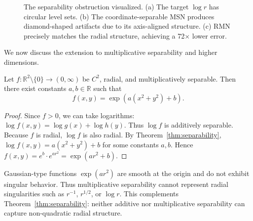 \documentclass[twoside,11pt]{article}
\newcommand{\R}{\mathbb{R}}
\begin{document}
\begin{figure}[!htbp]
	\caption{The separability obstruction visualized. (a) The target $\log r$ has circular level sets. (b) The coordinate-separable MSN produces diamond-shaped artifacts due to its axis-aligned structure. (c) RMN precisely matches the radial structure, achieving a 72$\times$ lower error.}
	\label{fig:obstruction_visual}
\end{figure}

We now discuss the extension to multiplicative separability and higher dimensions.

\begin{proposition}
	\label{prop:multiplicative}
	Let $f: \R^2 \setminus \{0\} \to (0, \infty)$ be $C^2$, radial, and multiplicatively separable. Then there exist constants $a, b \in \R$ such that
	\[
		f(x, y) = \exp(a(x^2 + y^2) + b).
	\]
\end{proposition}

\begin{proof}
	Since $f > 0$, we can take logarithms: $\log f(x, y) = \log g(x) + \log h(y)$. Thus $\log f$ is additively separable. Because $f$ is radial, $\log f$ is also radial. By Theorem~\ref{thm:separability}, $\log f(x, y) = a(x^2 + y^2) + b$ for some constants $a, b$. Hence $f(x, y) = e^b \cdot e^{ar^2} = \exp(ar^2 + b)$.
\end{proof}

\begin{remark}
	Gaussian-type functions $\exp(ar^2)$ are smooth at the origin and do not exhibit singular behavior. Thus multiplicative separability cannot represent radial singularities such as $r^{-1}$, $r^{1/2}$, or $\log r$. This complements Theorem~\ref{thm:separability}: neither additive nor multiplicative separability can capture non-quadratic radial structure.
\end{remark}
\end{document}
